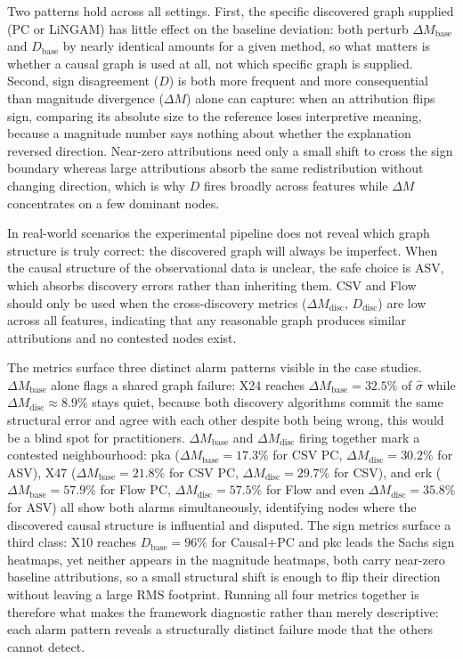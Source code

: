 \documentclass[12pt,a4paper,oneside]{article}
\begin{document}
Two patterns hold across all settings. First, the specific discovered graph supplied (PC or LiNGAM) has little effect on the baseline deviation: both perturb $\Delta M_{\text{base}}$ and $D_{\text{base}}$ by nearly identical amounts for a given method, so what matters is whether a causal graph is used at all, not which specific graph is supplied. Second, sign disagreement ($D$) is both more frequent and more consequential than magnitude divergence ($\Delta M$) alone can capture: when an attribution flips sign, comparing its absolute size to the reference loses interpretive meaning, because a magnitude number says nothing about whether the explanation reversed direction. Near-zero attributions need only a small shift to cross the sign boundary whereas large attributions absorb the same redistribution without changing direction, which is why $D$ fires broadly across features while $\Delta M$ concentrates on a few dominant nodes.

In real-world scenarios the experimental pipeline does not reveal which graph structure is truly correct: the discovered graph will always be imperfect. When the causal structure of the observational data is unclear, the safe choice is ASV, which absorbs discovery errors rather than inheriting them. CSV and Flow should only be used when the cross-discovery metrics ($\Delta M_{\text{disc}}$, $D_{\text{disc}}$) are low across all features, indicating that any reasonable graph produces similar attributions and no contested nodes exist.

The metrics surface three distinct alarm patterns visible in the case studies.
$\Delta M_{\text{base}}$ alone flags a shared graph failure: X24 reaches $\Delta M_{\text{base}} = 32.5\%$
of $\hat{\sigma}$ while $\Delta M_{\text{disc}} \approx 8.9\%$ stays quiet, because both discovery
algorithms commit the same structural error and agree with each other despite both being wrong, 
this would be a blind spot for practitioners.
$\Delta M_{\text{base}}$ and $\Delta M_{\text{disc}}$ firing together mark a contested neighbourhood:
pka ($\Delta M_{\text{base}} = 17.3\%$ for CSV PC, $\Delta M_{\text{disc}} = 30.2\%$  for ASV),
X47 ($\Delta M_{\text{base}} = 21.8\%$ for CSV PC, $\Delta M_{\text{disc}} = 29.7\%$ for CSV), and
erk ($\Delta M_{\text{base}} = 57.9\%$ for Flow PC, $\Delta M_{\text{disc}} = 57.5\%$ for Flow 
and even $\Delta M_{\text{disc}} = 35.8\%$ for ASV) all show both alarms simultaneously, identifying nodes where the discovered
causal structure is influential and disputed. The sign metrics surface a third
class: X10 reaches $D_{\text{base}} = 96\%$ for Causal+PC and pkc leads the
Sachs sign heatmaps, yet neither appears in the magnitude heatmaps, both carry
near-zero baseline attributions, so a small structural shift is enough to flip
their direction without leaving a large RMS footprint. Running all four metrics
together is therefore what makes the framework diagnostic rather than merely descriptive:
each alarm pattern reveals a structurally distinct failure mode that the others cannot detect.
\end{document}
